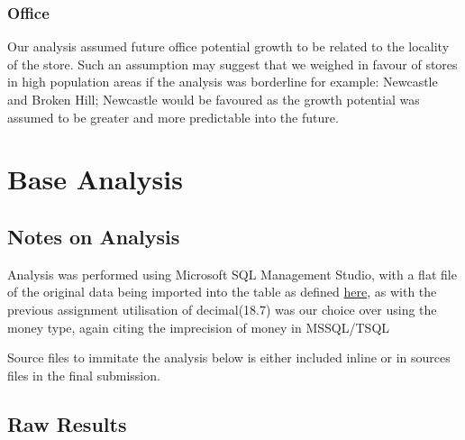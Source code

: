 \documentclass{article}
\begin{document}
            \subsubsection{Office}
                Our analysis assumed future office potential growth to be 
                related to the locality of the store. Such an assumption
                may suggest that we weighed in favour of stores in 
                high population areas if the analysis was borderline
                for example: Newcastle and Broken Hill; Newcastle
                would be favoured as the growth potential was assumed to 
                be greater and more predictable into the future.

            \newpage

    \section{Base Analysis}
    \label{sec:BA}

        \subsection{Notes on Analysis}
            Analysis was performed using Microsoft SQL Management Studio,
            with a flat file of the original data being imported into 
            the table as defined \hyperref[sec:ETL]{\color{blue}here},
            as with the previous assignment utilisation of decimal(18.7) was our choice over using the money type, again citing
            the imprecision of money in MSSQL/TSQL\cite{MoneyIssues}

            Source files to immitate the analysis below is either included inline or in sources files in the final submission.


            \subsection{Raw Results}
\end{document}
